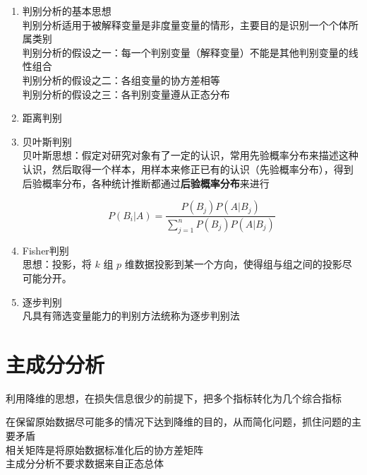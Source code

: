\documentclass[UTF8,10pt]{book}
\begin{document}
\begin{enumerate}
	\def\labelenumi{\arabic{enumi}.}
	\item
	判别分析的基本思想\\
	判别分析适用于被解释变量是非度量变量的情形，主要目的是识别一个个体所属类别\\
	判别分析的假设之一：每一个判别变量（解释变量）不能是其他判别变量的线性组合\\
	判别分析的假设之二：各组变量的协方差相等\\
	判别分析的假设之三：各判别变量遵从正态分布
	\item
	距离判别
	\item
	贝叶斯判别\\
	贝叶斯思想：{\kaishu 假定对研究对象有了一定的认识，常用先验概率分布来描述这种认识，然后取得一个样本，用样本来修正已有的认识（先验概率分布），得到后验概率分布，各种统计推断都通过\textbf{后验概率分布}来进行}
	
	\[P(B_i | A) = \frac{P(B_j)P(A | B_j)}{\sum_{j=1}^{n} P(B_j)P(A | B_j )}\]
	\item
	Fisher判别\\
	思想：投影，将 \(k\) 组 \(p\)
	维数据投影到某一个方向，使得组与组之间的投影尽可能分开。
	\item
	逐步判别\\
	凡具有筛选变量能力的判别方法统称为逐步判别法
\end{enumerate}

\section{主成分分析}\label{header-n62}

利用降维的思想，在损失信息很少的前提下，把多个指标转化为几个综合指标

在保留原始数据尽可能多的情况下达到降维的目的，从而简化问题，抓住问题的主要矛盾\\
相关矩阵是将原始数据标准化后的协方差矩阵\\
主成分分析不要求数据来自正态总体
\end{document}
